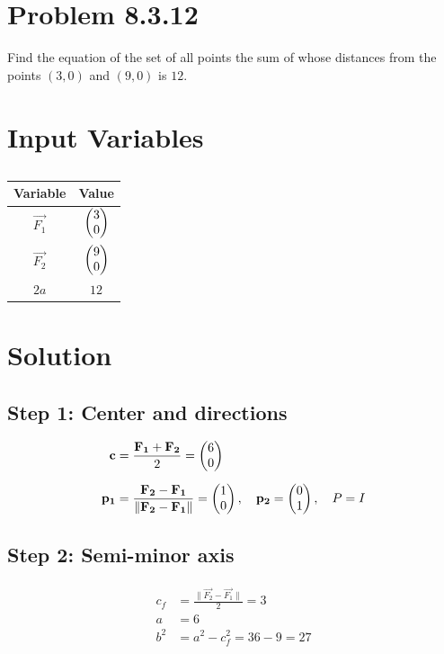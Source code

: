 \documentclass[12pt]{article}
\begin{document}
\section*{Problem 8.3.12}
Find the equation of the set of all points the sum of whose distances 
from the points $(3,0)$ and $(9,0)$ is $12$.

\section*{Input Variables}
\begin{table}[H]
\centering
\begin{tabular}{|c|c|}
\hline
Variable & Value \\
\hline
$\vec{F_1}$ & $\begin{pmatrix}3\\0\end{pmatrix}$ \\
\hline
$\vec{F_2}$ & $\begin{pmatrix}9\\0\end{pmatrix}$ \\
\hline
$2a$ & $12$ \\
\hline
\end{tabular}
\caption{} \label{}
\end{table}

\section*{Solution}

\subsection*{Step 1: Center and directions}
\begin{align}
\mathbf{c} &= \frac{\mathbf{F_1}+\mathbf{F_2}}{2} 
= \begin{pmatrix}6\\0\end{pmatrix} \\[6pt]
\mathbf{p_1} &= \frac{\mathbf{F_2}-\mathbf{F_1}}{\|\mathbf{F_2}-\mathbf{F_1}\|}
= \begin{pmatrix}1\\0\end{pmatrix}, \quad 
\mathbf{p_2} = \begin{pmatrix}0\\1\end{pmatrix}, \quad 
P = I
\end{align}

\subsection*{Step 2: Semi-minor axis}
\begin{align}
c_f &= \frac{\|\vec{F_2}-\vec{F_1}\|}{2} = 3 \\[6pt]
a &= 6 \\[6pt]
b^2 &= a^2 - c_f^2 = 36 - 9 = 27
\end{align}
\end{document}
